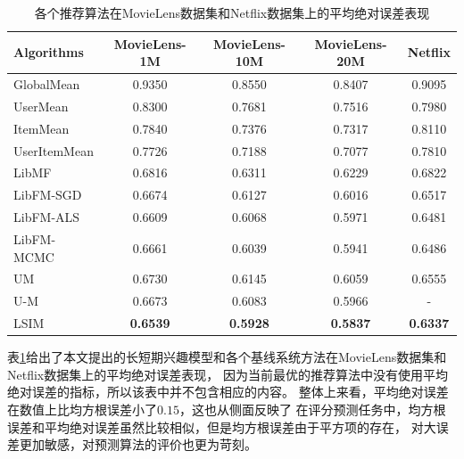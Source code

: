 \begin{table}[htbp]
    \centering
    \caption{各个推荐算法在MovieLens数据集和Netflix数据集上的平均绝对误差表现}
    \label{tab:mae}
    \begin{tabular}{|l|c|c|c|c|}
        \hline
        \textbf{Algorithms} & \textbf{MovieLens-1M} & \textbf{MovieLens-10M} & \textbf{MovieLens-20M} & \textbf{Netflix} \\
        \hline
        GlobalMean   & 0.9350          & 0.8550          & 0.8407          & 0.9095          \\
        UserMean     & 0.8300          & 0.7681          & 0.7516          & 0.7980          \\
        ItemMean     & 0.7840          & 0.7376          & 0.7317          & 0.8110          \\
        UserItemMean & 0.7726          & 0.7188          & 0.7077          & 0.7810          \\
        \hline
        LibMF        & 0.6816          & 0.6311          & 0.6229          & 0.6822          \\
        \hline
        LibFM-SGD    & 0.6674          & 0.6127          & 0.6016          & 0.6517          \\
        LibFM-ALS    & 0.6609          & 0.6068          & 0.5971          & 0.6481          \\
        LibFM-MCMC   & 0.6661          & 0.6039          & 0.5941          & 0.6486          \\
        \hline
        UM           & 0.6730          & 0.6145          & 0.6059          & 0.6555          \\
        U-M          & 0.6673          & 0.6083          & 0.5966          & -               \\
        \hline
        LSIM         & \textbf{0.6539} & \textbf{0.5928} & \textbf{0.5837} & \textbf{0.6337} \\
        \hline
    \end{tabular}
\end{table}

表\ref{tab:mae}给出了本文提出的长短期兴趣模型和各个基线系统方法在MovieLens数据集和Netflix数据集上的平均绝对误差表现，
因为当前最优的推荐算法中没有使用平均绝对误差的指标，所以该表中并不包含相应的内容。
整体上来看，平均绝对误差在数值上比均方根误差小了$0.15$，这也从侧面反映了
在评分预测任务中，均方根误差和平均绝对误差虽然比较相似，但是均方根误差由于平方项的存在，
对大误差更加敏感，对预测算法的评价也更为苛刻。

